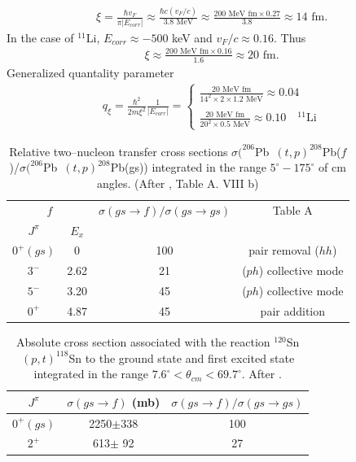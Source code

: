 \begin{subappendices}
\begin{align}
 \xi=\frac{\hbar v_F}{\pi|E_{corr}|}\approx\frac{\hbar c(v_F/c)}{3.8\text{ MeV}}\approx\frac{200\text{ MeV fm}\times 0.27}{3.8}\approx 14\text{ fm}.
 \end{align} 
 In the case of $^{11}$Li, $E_{corr}\approx-500$ keV and $v_F/c\approx 0.16$. Thus
 \begin{align}
 \xi\approx\frac{200\text{ MeV fm}\times 0.16}{1.6}\approx 20\text{ fm}.
 \end{align} 
 Generalized quantality parameter 
 \begin{align}
 q_{\xi}=\frac{\hbar^2}{2m\xi^2}\frac{1}{|E_{corr}|}=\left\{\begin{array}{l}
 \frac{20\text{ MeV fm}}{14^2\times 2\times 1.2\text{ MeV}}\approx 0.04	\\ 
 \\ 
 \frac{20\text{ MeV fm}}{20^2\times 0.5\text{ MeV}}\approx 0.10\quad ^{11}\text{Li}	
 \end{array}\right. 
 \end{align}
    \begin{table}
    	\begin{tabular}{|c|c|c|c|}
    		\hline
    		\multicolumn{2}{|c|}{$f$} & $\sigma(gs\rightarrow f)/\sigma(gs\rightarrow gs)$ & Table A   \\
    		\cline{1-2}
    		$J^{\pi}$& $E_x$ & & \\
    		\hline
    		$0^+(gs)$ & 0& 100& pair removal ($hh$)\\
    		\hline
    		$3^-$ & 2.62& 21& ($ph$) collective mode\\
    		\hline
    		$5^-$ & 3.20& 45& ($ph$) collective mode\\
    		\hline
    		$0^+$ & 4.87& 45& pair addition\\
    		\hline
    	\end{tabular}\caption{Relative two--nucleon transfer cross sections \mbox{$\sigma (^{206}$Pb $(t,p)^{208}$Pb($f$)/$\sigma (^{206}$Pb $(t,p)^{208}$Pb(gs))} integrated in the range $5^\circ-175^\circ$ of cm angles. (After \cite{Broglia:73}, Table A. VIII b)}\label{Tab3.B.1}
    \end{table}
    \begin{table}
    	\begin{tabular}{|c|c|c|}
    		\hline
    		$J^{\pi}$& $\sigma(gs\rightarrow f)$ (mb) & $\sigma(gs\rightarrow f)/\sigma(gs\rightarrow gs)$  \\
    		\hline
    		$0^+(gs)$ & 2250$\pm$338& 100\\
    		$2^+$ & 613$\pm$ 92& 27\\
    		\hline
    	\end{tabular}\caption{Absolute cross section associated with the reaction $^{120}$Sn $(p,t)^{118}$Sn to the ground state and first excited state integrated in the range $7.6^\circ < \theta_{cm}<69.7^\circ$. After \cite{Guazzoni:08}.}\label{Tab3.B.2}
    \end{table}


\end{subappendices}
